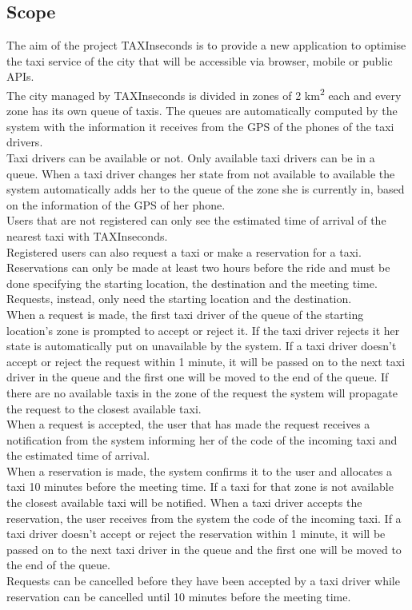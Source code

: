 \documentclass{article}
\begin{document}
\subsection{Scope}
The aim of the project TAXInseconds is to provide a new application to optimise the taxi service of the city that will be accessible via browser, mobile or public APIs.
\\The city managed by TAXInseconds is divided in zones of 2 km\textsuperscript{2} each and every zone has its own queue of taxis. The queues are automatically computed by the system with the information it receives from the GPS of the phones of the taxi drivers.
\\Taxi drivers can be available or not. Only available taxi drivers can be in a queue. When a taxi driver changes her state from not available to available the system automatically adds her to the queue of the zone she is currently in, based on the information of the GPS of her phone. 
\\Users that are not registered can only see the estimated time of arrival of the nearest taxi with TAXInseconds.\@
\\Registered users can also request a taxi or make a reservation for a taxi. Reservations can only be made at least two hours before the ride and must be done specifying the starting location, the destination and the meeting time. Requests, instead, only need the starting location and the destination.
\\When a request is made, the first taxi driver of the queue of the starting location's zone is prompted to accept or reject it. If the taxi driver rejects it her state is automatically put on unavailable by the system. If a taxi driver doesn't accept or reject the request within 1 minute, it will be passed on to the next taxi driver in the queue and the first one will be moved to the end of the queue. If there are no available taxis in the zone of the request the system will propagate the request to the closest available taxi.
\\When a request is accepted, the user that has made the request receives a notification from the system informing her of the code of the incoming taxi and the estimated time of arrival.
\\When a reservation is made, the system confirms it to the user and allocates a taxi 10 minutes before the meeting time. If a taxi for that zone is not available the closest available taxi will be notified. When a taxi driver accepts the reservation, the user receives from the system the code of the incoming taxi. If a taxi driver doesn't accept or reject the reservation within 1 minute, it will be passed on to the next taxi driver in the queue and the first one will be moved to the end of the queue.
\\Requests can be cancelled before they have been accepted by a taxi driver while reservation can be cancelled until 10 minutes before the meeting time.
\end{document}
